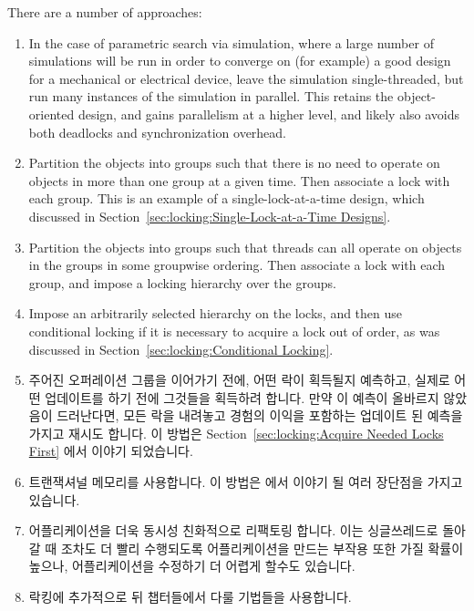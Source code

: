 {\begin{enumerate}
	There are a number of approaches:
	\begin{enumerate}
	\item	In the case of parametric search via simulation,
		where a large number of simulations will be run
		in order to converge on (for example) a good design
		for a mechanical or electrical device, leave the
		simulation single-threaded, but run many instances
		of the simulation in parallel.
		This retains the object-oriented design, and gains
		parallelism at a higher level, and likely also avoids
		both deadlocks and synchronization overhead.
	\item	Partition the objects into groups such that there
		is no need to operate on objects in
		more than one group at a given time.
		Then associate a lock with each group.
		This is an example of a single-lock-at-a-time
		design, which discussed in
		Section~\ref{sec:locking:Single-Lock-at-a-Time Designs}.
	\item	Partition the objects into groups such that threads
		can all operate on objects in the groups in some
		groupwise ordering.
		Then associate a lock with each group, and impose a
		locking hierarchy over the groups.
	\item	Impose an arbitrarily selected hierarchy on the locks,
		and then use conditional locking if it is necessary
		to acquire a lock out of order, as was discussed in
		Section~\ref{sec:locking:Conditional Locking}.

	\fi

	\item	주어진 오퍼레이션 그룹을 이어가기 전에, 어떤 락이 획득될지
		예측하고, 실제로 어떤 업데이트를 하기 전에 그것들을 획득하려
		합니다.
		만약 이 예측이 올바르지 않았음이 드러난다면, 모든 락을 내려놓고
		경험의 이익을 포함하는 업데이트 된 예측을 가지고 재시도 합니다.
		이 방법은
		Section~\ref{sec:locking:Acquire Needed Locks First}
		에서 이야기 되었습니다.
	\item	트랜잭셔널 메모리를 사용합니다.
		이 방법은
		에서 이야기 될 여러 장단점을 가지고 있습니다.
	\item	어플리케이션을 더욱 동시성 친화적으로 리팩토링 합니다.
		이는 싱글쓰레드로 돌아갈 때 조차도 더 빨리 수행되도록
		어플리케이션을 만드는 부작용 또한 가질 확률이 높으나,
		어플리케이션을 수정하기 더 어렵게 할수도 있습니다.
	\item	락킹에 추가적으로 뒤 챕터들에서 다룰 기법들을 사용합니다.
	\end{enumerate}


\end{enumerate}}

